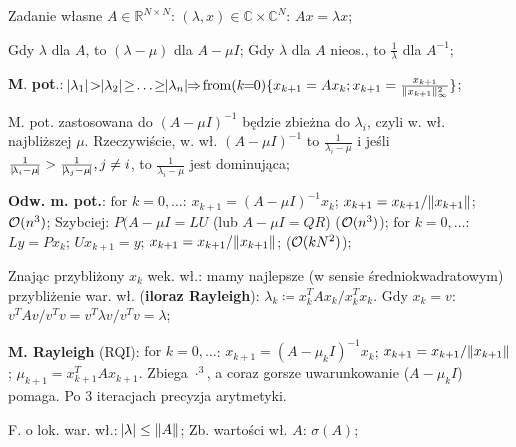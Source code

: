 
\entry
Zadanie własne $A \in \mathbb{R}^{N \times N}$:
$(\lambda,x) \in \mathbb{C} \times \mathbb{C}^N$:
$Ax = \lambda x$;

\entry
Gdy $\lambda$ dla $A$, to $(\lambda - \mu)$ dla $A-\mu I$;
\entry
Gdy $\lambda$ dla $A$ nieos., to $\frac{1}{\lambda}$ dla $A^{-1}$;

\entry
\textbf{M}. \textbf{pot}.:
$\abs{\lambda_1} \!>\! \abs{\lambda_2} \!\geq\! \ldots \!\geq\! \abs{\lambda_n}
\!\!\Rightarrow\!
\fromloop{k}\{x_{k+1}=Ax_k; \normifyfrac[\infty][2]{x_{k+1}}\}$;

\entry
M. pot. zastosowana do
$(A-\mu I)^{-1}$
będzie zbieżna do
$\lambda_i$,
czyli w. wł. najbliższej $\mu$.
Rzeczywiście, w. wł.
$(A-\mu I)^{-1}$
to
$\frac{1}{\lambda_i-\mu}$
i jeśli
$\frac{1}{\mid\! \lambda_i-\mu\! \mid} > \frac{1}{\mid\! \lambda_j-\mu\! \mid}, j\neq i$,
to
$\frac{1}{\lambda_i-\mu}$
jest dominująca;

\entry
\textbf{Odw. m. pot.}:
$\text{for } k=0,\ldots$:
$x_{k+1} = (A-\mu I)^{-1}x_k$;
$x_{k+1} = x_{k+1} / \|x_{k+1}\|$;
$\mathcal{O}(n^3)$;
\entry
Szybciej:
$P(A- \mu I = LU$ (lub $A-\mu I = QR$) ($\mathcal{O}(n^3)$);
$\text{for } k=0,\ldots$:
$Ly=Px_k$;
$Ux_{k+1} = y$;
$x_{k+1} = x_{k+1} / \|x_{k+1}\|$;
($\mathcal{O}(kN^2)$);

\entry
Znając przybliżony $x_k$ wek. wł.: mamy najlepsze (w sensie
średniokwadratowym) przybliżenie war. wł. (\textbf{iloraz Rayleigh}):
$\lambda_k \coloneqq x_k^T A x_k / x_k^T x_k$.
Gdy $x_k = v$:
$v^T A v / v^T v = v^T \lambda v / v^T v = \lambda$;

\entry
\textbf{M. Rayleigh} (RQI):
$\text{for } k=0,\ldots$:
$x_{k+1} = (A - \mu_k I)^{-1} x_k$;
$x_{k+1} = x_{k+1} / \|x_{k+1}\|$;
$\mu_{k+1} = x_{k+1}^T A x_{k+1}$.
Zbiega $\cdot^3$, a coraz gorsze uwarunkowanie ($A-\mu_k I$) pomaga.
Po $3$ iteracjach precyzja arytmetyki.


\entry
F. o lok. war. wł.:
$\abs{\lambda} \leq \|A\|$;
\entry
Zb. wartości wł. $A$:
$\sigma(A)$;

